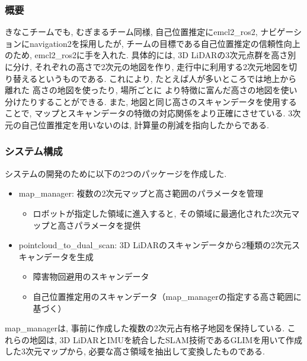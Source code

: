 \subsubsection{概要}

きなこチームでも, むぎまるチーム同様, 
自己位置推定にemcl2\_ros2, ナビゲーションにnavigation2を採用したが, 
チームの目標である自己位置推定の信頼性向上のため, 
emcl2\_ros2に手を入れた. 
具体的には, 3D LiDARの3次元点群を高さ別に分け, 
それぞれの高さで2次元の地図を作り, 
走行中に利用する2次元地図を切り替えるというものである. 
これにより, たとえば人が多いところでは地上から離れた
高さの地図を使ったり, 場所ごとに
より特徴に富んだ高さの地図を使い分けたりすることができる. 
また, 地図と同じ高さのスキャンデータを使用することで, 
マップとスキャンデータの特徴の対応関係をより正確にさせている. 
3次元の自己位置推定を用いないのは, 
計算量の削減を指向したからである. 



\subsubsection{システム構成}
システムの開発のために以下の2つのパッケージを作成した. 

\begin{itemize}
  \item map\_manager: 複数の2次元マップと高さ範囲のパラメータを管理
    \begin{itemize}
      \item ロボットが指定した領域に進入すると, その領域に最適化された2次元マップと高さパラメータを提供
    \end{itemize}
  \item pointcloud\_to\_dual\_scan: 3D LiDARのスキャンデータから2種類の2次元スキャンデータを生成
        \begin{itemize}
          \item 障害物回避用のスキャンデータ
          \item 自己位置推定用のスキャンデータ（map\_managerの指定する高さ範囲に基づく）
        \end{itemize}
\end{itemize}
map\_managerは, 事前に作成した複数の2次元占有格子地図を保持している. 
これらの地図は, 3D LiDARとIMUを統合したSLAM技術であるGLIM\cite{glim}を用いて作成した3次元マップから, 必要な高さ領域を抽出して変換したものである. 

